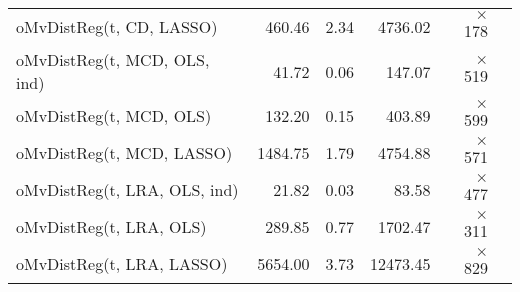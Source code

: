 \begin{tabular}{lrrrrr}
oMvDistReg(t, CD, LASSO) & {\cellcolor[HTML]{2E7EBC}} \color[HTML]{F1F1F1} 460.46 & {\cellcolor[HTML]{084A91}} \color[HTML]{F1F1F1} 2.34 & {\cellcolor[HTML]{1562A9}} \color[HTML]{F1F1F1} 4736.02 & {\cellcolor[HTML]{2F7FBC}} \color[HTML]{F1F1F1} $\times$ 178 \\
oMvDistReg(t, MCD, OLS, ind) & {\cellcolor[HTML]{8DC1DD}} \color[HTML]{000000} 41.72 & {\cellcolor[HTML]{E0ECF8}} \color[HTML]{000000} 0.06 & {\cellcolor[HTML]{E1EDF8}} \color[HTML]{000000} 147.07 & {\cellcolor[HTML]{08488E}} \color[HTML]{F1F1F1} $\times$ 519 \\
oMvDistReg(t, MCD, OLS) & {\cellcolor[HTML]{5AA2CF}} \color[HTML]{F1F1F1} 132.20 & {\cellcolor[HTML]{B2D2E8}} \color[HTML]{000000} 0.15 & {\cellcolor[HTML]{B2D2E8}} \color[HTML]{000000} 403.89 & {\cellcolor[HTML]{084184}} \color[HTML]{F1F1F1} $\times$ 599 \\
oMvDistReg(t, MCD, LASSO) & {\cellcolor[HTML]{0E59A2}} \color[HTML]{F1F1F1} 1484.75 & {\cellcolor[HTML]{0E58A2}} \color[HTML]{F1F1F1} 1.79 & {\cellcolor[HTML]{1562A9}} \color[HTML]{F1F1F1} 4754.88 & {\cellcolor[HTML]{084387}} \color[HTML]{F1F1F1} $\times$ 571 \\
oMvDistReg(t, LRA, OLS, ind) & {\cellcolor[HTML]{A9CFE5}} \color[HTML]{000000} 21.82 & {\cellcolor[HTML]{F7FBFF}} \color[HTML]{000000} 0.03 & {\cellcolor[HTML]{F7FBFF}} \color[HTML]{000000} 83.58 & {\cellcolor[HTML]{084C95}} \color[HTML]{F1F1F1} $\times$ 477 \\
oMvDistReg(t, LRA, OLS) & {\cellcolor[HTML]{3C8CC3}} \color[HTML]{F1F1F1} 289.85 & {\cellcolor[HTML]{3787C0}} \color[HTML]{F1F1F1} 0.77 & {\cellcolor[HTML]{4997C9}} \color[HTML]{F1F1F1} 1702.47 & {\cellcolor[HTML]{1562A9}} \color[HTML]{F1F1F1} $\times$ 311 \\
oMvDistReg(t, LRA, LASSO) & {\cellcolor[HTML]{08306B}} \color[HTML]{F1F1F1} 5654.00 & {\cellcolor[HTML]{08306B}} \color[HTML]{F1F1F1} 3.73 & {\cellcolor[HTML]{08306B}} \color[HTML]{F1F1F1} 12473.45 & {\cellcolor[HTML]{08306B}} \color[HTML]{F1F1F1} $\times$ 829 \\
\bottomrule
\end{tabular}
